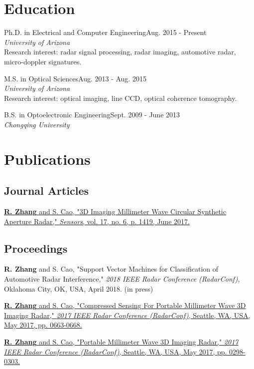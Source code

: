 \documentclass[letterpaper,10pt]{article}
\renewenvironment{itemize}{
  \begin{list}{}{
    \setlength{\leftmargin}{1.5em}
  }
}{
  \end{list}
}
\begin{document}
\section*{Education}

\begin{itemize}
  \item Ph.D. in Electrical and Computer Engineering\hfill Aug. 2015 - Present\\ {\it University of Arizona}\\Research interest: radar signal processing, radar imaging, automotive radar, micro-doppler signatures.
  \item M.S. in Optical Sciences\hfill Aug. 2013 - Aug. 2015\\ {\it University of Arizona}\\Research interest: optical imaging, line CCD, optical coherence tomography.
  \item B.S. in Optoelectronic Engineering\hfill Sept. 2009 - June 2013\\ {\it Chongqing University}
\end{itemize}


\section*{Publications}

\subsection*{Journal Articles}

\begin{itemize}
\item \href{http://www.mdpi.com/1424-8220/17/6/1419}{{\bf R. Zhang} and S. Cao, "3D Imaging Millimeter Wave Circular Synthetic Aperture Radar," {\it Sensors}, vol. 17, no. 6, p. 1419, June 2017.}
\end{itemize}

\subsection*{Proceedings}

\begin{itemize}
\item {\bf R. Zhang} and S. Cao, "Support Vector Machines for Classification of Automotive Radar Interference," {\it 2018 IEEE Radar Conference (RadarConf)}, Oklahoma City, OK, USA, April 2018. (in press)
\item \href{http://ieeexplore.ieee.org/document/7944286/}{{\bf R. Zhang} and S. Cao, "Compressed Sensing For Portable Millimeter Wave 3D Imaging Radar," {\it 2017 IEEE Radar Conference (RadarConf)}, Seattle, WA, USA, May 2017, pp. 0663-0668.}
\item \href{http://ieeexplore.ieee.org/abstract/document/7944216/}{{\bf R. Zhang} and S. Cao, "Portable Millimeter Wave 3D Imaging Radar," {\it 2017 IEEE Radar Conference (RadarConf)}, Seattle, WA, USA, May 2017, pp. 0298-0303.}
\end{itemize}
\end{document}
